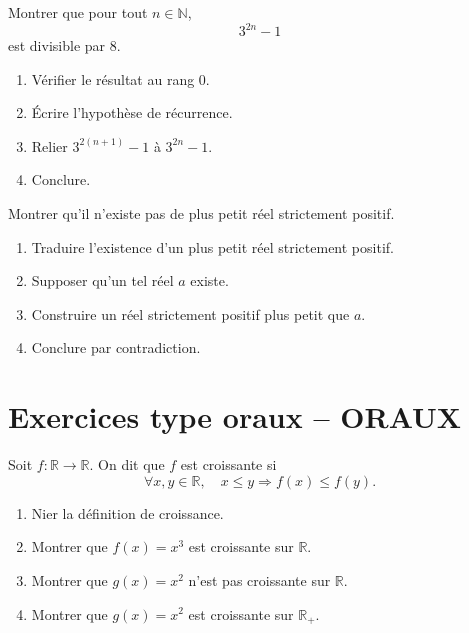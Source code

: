 \documentclass[11pt,a4paper]{article}
\newcommand{\N}{\mathbb{N}}
\newcommand{\R}{\mathbb{R}}
\newcommand{\imp}{\Rightarrow}
\begin{document}
\begin{exercicebox}
Montrer que pour tout \(n\in\N\),
\[
3^{2n}-1
\]
est divisible par \(8\).

\begin{enumerate}[label=\alph*)]
    \item Vérifier le résultat au rang \(0\).
    \item Écrire l'hypothèse de récurrence.
    \item Relier \(3^{2(n+1)}-1\) à \(3^{2n}-1\).
    \item Conclure.
\end{enumerate}
\end{exercicebox}

\begin{exercicebox}
Montrer qu'il n'existe pas de plus petit réel strictement positif.

\begin{enumerate}[label=\alph*)]
    \item Traduire l'existence d'un plus petit réel strictement positif.
    \item Supposer qu'un tel réel \(a\) existe.
    \item Construire un réel strictement positif plus petit que \(a\).
    \item Conclure par contradiction.
\end{enumerate}
\end{exercicebox}

\section{Exercices type oraux -- ORAUX}

\begin{exercicebox}
Soit \(f:\R\to\R\). On dit que \(f\) est croissante si
\[
\forall x,y\in\R,\quad x\leq y\imp f(x)\leq f(y).
\]

\begin{enumerate}[label=\alph*)]
    \item Nier la définition de croissance.
    \item Montrer que \(f(x)=x^3\) est croissante sur \(\R\).
    \item Montrer que \(g(x)=x^2\) n'est pas croissante sur \(\R\).
    \item Montrer que \(g(x)=x^2\) est croissante sur \(\R_+\).
\end{enumerate}
\end{exercicebox}
\end{document}
